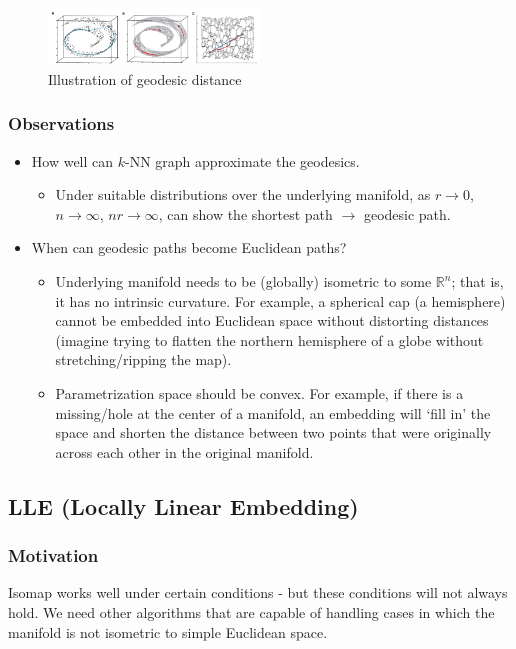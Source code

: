 \begin{figure}
\centering
\includegraphics[width=0.5\textwidth]{chapter_7/files/isomap.png}
\caption{Illustration of geodesic distance}
\end{figure}

\subsubsection*{Observations}
\begin{itemize}
\item How well can $k$-NN graph approximate the geodesics.
  \begin{itemize}
  \item Under suitable distributions over the underlying    manifold,
    as $r\rightarrow 0$, $n\rightarrow \infty$, $nr \rightarrow
    \infty$, can show the shortest path $\rightarrow$ geodesic path. 
  \end{itemize}
\item When can geodesic paths become Euclidean paths?
  \begin{itemize}
  \item Underlying manifold needs to be (globally) isometric to some
    $\mathbb{R}^n$; that is, it has no intrinsic curvature. For
    example, a spherical cap (a hemisphere) cannot be embedded into
    Euclidean space without distorting distances (imagine trying to
    flatten the northern hemisphere of a globe without
    stretching/ripping the map).  
  \item Parametrization space should be convex. For example, if there
    is a missing/hole at the center of a manifold, an embedding will
    `fill in' the space and shorten the distance between two points
    that were originally across each other in the original manifold. 
  \end{itemize}
\end{itemize}


\subsection{LLE (Locally Linear Embedding)}
\subsubsection*{Motivation}
Isomap works well under certain conditions - but these conditions will not always hold. We need other algorithms that are capable of handling cases in which the manifold is not isometric to simple Euclidean space.

